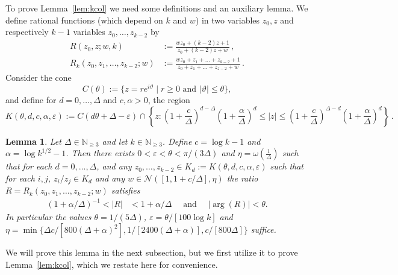\documentclass[10pt,a4paper]{article}
\newtheorem{lemma}[theorem]{Lemma}
\theoremstyle{definition}
\newcommand*{\eps}{\varepsilon}
\begin{document}
To prove Lemma~\ref{lem:kcol} we need some definitions and an auxiliary lemma. 
We define rational functions (which depend on $k$ and $w$) in two variables $z_0,z$ and respectively $k-1$ variables $z_0,\ldots,z_{k-2}$ by
\begin{align*}
 R(z_0,z;w,k) &:= \frac{wz_0+(k-2)z+1}{z_0+(k-2)z+w}\,,\\
 R_k(z_0,z_1,\ldots,z_{k-2};w) &:= \frac{wz_0+z_1+\ldots+z_{k-2}+1}{z_0+z_1+\ldots+z_{z-2}+w}\,.
\end{align*}
Consider the cone
\[
C(\theta):=\{z=re^{i\vartheta}\mid r\geq 0 \text{ and } |\vartheta|\leq \theta\},
\]
and define for $d=0,\dotsc,\Delta$ and $c,\alpha> 0$, the region
\[
K(\theta,d,c,\alpha,\eps):=C(d\theta+\Delta-\eps)\cap \left\{z: \left(1+\frac{c}{\Delta}\right)^{d-\Delta}\left(1+\frac{\alpha}{\Delta}\right)^{d}\leq |z|\le\left(1+\frac{c}{\Delta}\right)^{\Delta-d}\left(1+\frac{\alpha}{\Delta}\right)^{d}\right\}\,.
\]
%
%
%
\begin{lemma}
\label{lem:forward invariant}
Let $\Delta\in \mathbb{N}_{\geq 3}$ and let $k\in \mathbb{N}_{\geq 3}$. Define $c=\log k-1$ and $\alpha=\log k^{1/2}-1$. Then there exists $0<\eps<\theta<\pi/(3\Delta)$ and $\eta=\omega(\frac{1}{\Delta})$
such that for each $d=0,\ldots,\Delta$, and any $z_0,\ldots,z_{k-2}\in K_d:=K(\theta,d,c,\alpha,\eps)$ such that for each $i,j$, $z_i/z_j\in K_d$ and any  $w\in \mathcal{N}([1,1+c/\Delta],\eta)$ the ratio $R=R_k(z_0,z_1,\ldots,z_{k-2};w)$ satisfies
\begin{align}
(1+\alpha/\Delta)^{-1}<|R|&< 1+\alpha/\Delta\quad \text{ and }\quad  |\arg(R)|< \theta.\label{eq:ratio bound arg}
\end{align}
In particular the values $\theta = 1/(5 \Delta)$, $\eps = \theta / [100 \log k]$ and $\eta = \min\{\Delta c / [800(\Delta + \alpha)^2], 1/[2400(\Delta+ \alpha)], c / [800 \Delta]\}$ suffice.
\end{lemma}
\noindent
We will prove this lemma in the next subsection, but we first utilize it to prove Lemma~\ref{lem:kcol}, which we restate here for convenience.
%
\zerofreeinduction*
%
\end{document}
